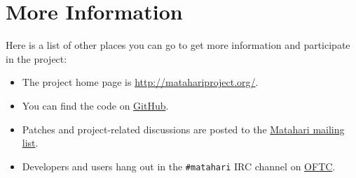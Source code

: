 \documentclass{tufte-handout}
\begin{document}
\section{More Information}

Here is a list of other places you can go to get more information and participate in the project:

\begin{itemize}
\item The project home page is \url{http://matahariproject.org/}.
\item You can find the code on \href{https://github.com/matahari/matahari}{GitHub}.
\item Patches and project-related discussions are posted to the \href{https://fedorahosted.org/mailman/listinfo/matahari}{Matahari mailing list}.
\item Developers and users hang out in the \texttt{\#matahari} IRC channel on \href{http://www.oftc.net/}{OFTC}.
\end{itemize}
\end{document}
